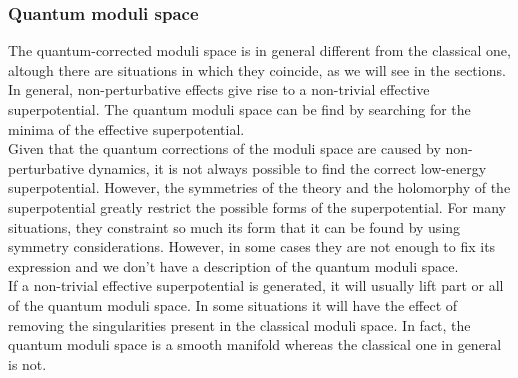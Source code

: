 \subsubsection{Quantum moduli space}
The quantum-corrected moduli space is in general different from the classical one, altough there are situations in which they coincide, as we will see in the sections.\\
In general, non-perturbative effects give rise to a non-trivial effective superpotential.
The quantum moduli space can be find by searching for the minima of the effective superpotential.\\
Given that the quantum corrections of the moduli space are caused by non-perturbative dynamics, it is not always possible to find the correct low-energy superpotential.
However, the symmetries of the theory and the holomorphy of the superpotential
greatly restrict the possible forms of the superpotential.
For many situations, they constraint so much its form that it can be found by using symmetry considerations.
However, in some cases they are not enough to fix its expression and we don't have a description of the quantum moduli space.
\\
If a non-trivial effective superpotential is generated, it will usually lift part or all of the quantum moduli space. 
In some situations it will have the effect of removing the singularities present in the classical moduli space.
In fact, the quantum moduli space is a smooth manifold whereas the classical one in general is not.





